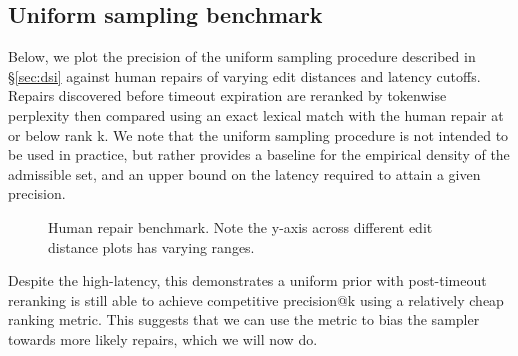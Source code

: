\documentclass[sigplan,review,anonymous,acmsmall]{acmart}\settopmatter{printfolios=false,printccs=false,printacmref=false}
\begin{document}
  \subsection{Uniform sampling benchmark}\label{sec:uniform}

  Below, we plot the precision of the uniform sampling procedure described in \S\ref{sec:dsi} against human repairs of varying edit distances and latency cutoffs. Repairs discovered before timeout expiration are reranked by tokenwise perplexity then compared using an exact lexical match with the human repair at or below rank k. We note that the uniform sampling procedure is not intended to be used in practice, but rather provides a baseline for the empirical density of the admissible set, and an upper bound on the latency required to attain a given precision.

  \begin{figure}[H]
    \resizebox{.3\textwidth}{!}{}
    \resizebox{.3\textwidth}{!}{}
    \resizebox{.3\textwidth}{!}{}
    \caption{Human repair benchmark. Note the y-axis across different edit distance plots has varying ranges.}\label{fig:human}
  \end{figure}

  Despite the high-latency, this demonstrates a uniform prior with post-timeout reranking is still able to achieve competitive precision@k using a relatively cheap ranking metric. This suggests that we can use the metric to bias the sampler towards more likely repairs, which we will now do.
\end{document}
